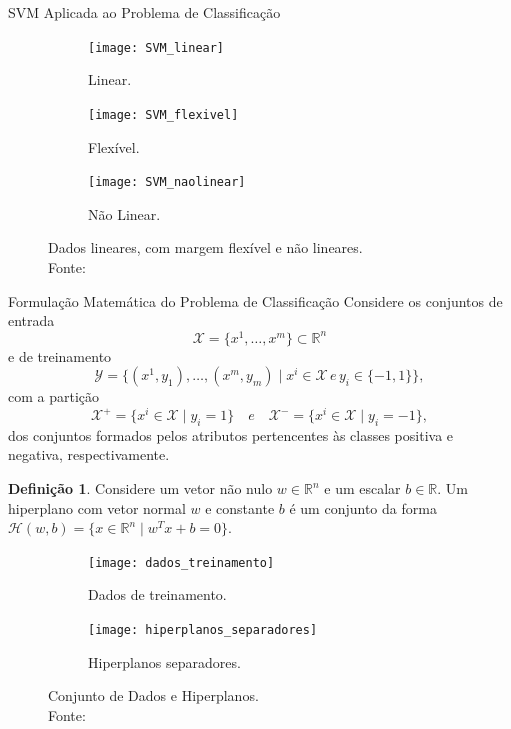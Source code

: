 \documentclass{beamer}
\def\Xset{\mathcal{X}}
\def\Yset{\mathcal{Y}}
\def\Hset{\mathcal{H}}
\def\RR{\mathds{R}}
\theoremstyle{definition}%
\newtheorem{defi}{Definição}
\begin{document}
\begin{frame}{SVM Aplicada ao Problema de Classificação}

\begin{figure}[!h] 
	\centering
	\begin{subfigure}[h]{0.3\textwidth}
		\centering
		\texttt{[image: SVM\_linear]}
		\caption{Linear. \label{fig1:a}}
	\end{subfigure}
	\begin{subfigure}[!h]{0.3\textwidth}
		\centering
		\texttt{[image: SVM\_flexivel]}
		\caption{Flexível. \label{fig1:b}}
	\end{subfigure}
	\begin{subfigure}[!h]{0.3\textwidth}
		\centering
		\texttt{[image: SVM\_naolinear]}
		\caption{Não Linear. \label{fig1:c}}
	\end{subfigure}
	\caption{Dados lineares, com margem flexível e não lineares. \label{fig1}\\ Fonte: \textcite{Evelin2017}}
\end{figure}
\end{frame}


\begin{frame}
\begin{block}{Formulação Matemática do Problema de Classificação}
Considere os conjuntos de entrada 
\[\Xset =\{x^1, \ldots , x^m \} \subset \RR^n \] 
e de treinamento 
\[\Yset=\{(x^1, y_1), \ldots , (x^m, y_m)\mid x^i \in \Xset \, e \, y_i \in \{-1,1\}\}, \]
com a partição 
\[ \label{conj1}
\Xset ^{+} =\{x^i \in \Xset\mid y_i=1\} \quad e \quad \Xset^{-}=\{x^i \in \Xset\mid y_i=-1\},
\]
dos conjuntos formados pelos atributos pertencentes às classes positiva e negativa, respectivamente.
\end{block}
\end{frame}


\begin{frame}

\begin{defi} 
Considere um vetor não nulo $w\in \RR^n$ e um escalar $b\in \RR$. Um hiperplano com vetor normal $w$ e constante $b$ é um conjunto da forma $\Hset(w,b)=\{x\in \RR^n \mid w^{T}x+b=0\}$.
\end{defi}

\begin{figure}[h] 
	\centering
	\begin{subfigure}[h]{0.36\textwidth}
		\centering
		\texttt{[image: dados\_treinamento]}
		\caption{Dados de treinamento. \label{fig2:a}}
	\end{subfigure}
	\begin{subfigure}[h]{0.34\textwidth}
		\centering
		\texttt{[image: hiperplanos\_separadores]}
		\caption{Hiperplanos separadores. \label{fig2:b}}
	\end{subfigure}
	\caption{Conjunto de Dados e Hiperplanos. \label{fig2}
		\\ Fonte: \textcite{Evelin2017}}
\end{figure}
\end{frame}
\end{document}
